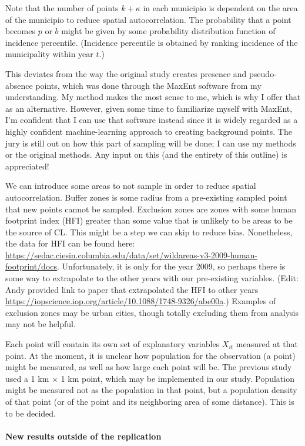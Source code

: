 \documentclass[
]{article}
\begin{document}
Note that the number of points \(k + \kappa\) in each municipio is
dependent on the area of the municipio to reduce spatial
autocorrelation. The probability that a point becomes \(p\) or \(b\)
might be given by some probability distribution function of incidence
percentile. (Incidence percentile is obtained by ranking incidence of
the municipality within year \(t\).)

This deviates from the way the original study creates presence and
pseudo-absence points, which was done through the MaxEnt software from
my understanding. My method makes the most sense to me, which is why I
offer that as an alternative. However, given some time to familiarize
myself with MaxEnt, I'm confident that I can use that software instead
since it is widely regarded as a highly confident machine-learning
approach to creating background points. The jury is still out on how
this part of sampling will be done; I can use my methods or the original
methods. Any input on this (and the entirety of this outline) is
appreciated!

We can introduce some areas to not sample in order to reduce spatial
autocorrelation. Buffer zones is some radius from a pre-existing sampled
point that new points cannot be sampled. Exclusion zones are zones with
some human footprint index (HFI) greater than some value that is
unlikely to be areas to be the source of CL. This might be a step we can
skip to reduce bias. Nonetheless, the data for HFI can be found here:
\url{https://sedac.ciesin.columbia.edu/data/set/wildareas-v3-2009-human-footprint/docs}.
Unfortunately, it is only for the year 2009, so perhaps there is some
way to extrapolate to the other years with our pre-existing variables.
(Edit: Andy provided link to paper that extrapolated the HFI to other
years
\url{https://iopscience.iop.org/article/10.1088/1748-9326/abe00a}.)
Examples of exclusion zones may be urban cities, though totally
excluding them from analysis may not be helpful.

Each point will contain its own set of explanatory variables \(X_{it}\)
measured at that point. At the moment, it is unclear how population for
the observation (a point) might be measured, as well as how large each
point will be. The previous study used a 1 km \(\times\) 1 km point,
which may be implemented in our study. Population might be measured not
as the population in that point, but a population density of that point
(or of the point and its neighboring area of some distance). This is to
be decided.

\hypertarget{new-results-outside-of-the-replication}{%
\paragraph{New results outside of the
replication}\label{new-results-outside-of-the-replication}}
\end{document}
